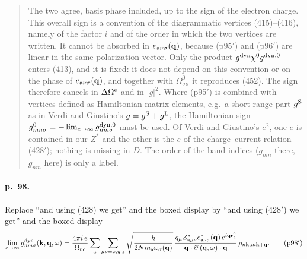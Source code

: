 \documentclass[11pt]{article}
\begin{document}
\begin{quote}
The two agree, basis phase included, up to the sign of the electron charge. This overall sign is a
convention of the diagrammatic vertices (415)--(416), namely of the factor $i$ and of the order in which
the two vertices are written. It cannot be absorbed in $e_{{\rm a}\nu\sigma}(\mathbf q)$, because (p95$'$)
and (p96$'$) are linear in the same polarization vector. Only the product $g^{\rm dyn}\chi^0g^{\rm dyn,0}$
enters (413), and it is fixed: it does not depend on this convention or on the phase of
$e_{{\rm a}\nu\sigma}(\mathbf q)$, and together with $\Omega^0_{\sigma\sigma}$ it reproduces (452). The sign
therefore cancels in $\Delta\Omega^{\rm e}$ and in $|g|^2$. Where (p95$'$) is combined with vertices defined
as Hamiltonian matrix elements, e.g.\ a short-range part $g^{\rm S}$ as in Verdi and Giustino's
$g=g^{\rm S}+g^{\rm L}$, the Hamiltonian sign $g^0_{mn\sigma}=-\lim_{c\to\infty}g^{\rm dyn,0}_{nm\sigma}$ must
be used. Of Verdi and Giustino's $e^2$, one $e$ is contained in our $Z^*$ and the other is the $e$ of the
charge--current relation (428$'$); nothing is missing in $D$. The order of the band indices ($g_{mn}$
there, $g_{nm}$ here) is only a label.
\end{quote}

\paragraph{p.~98.} Replace ``and using (428) we get'' and the boxed display by ``and using (428$'$) we
get'' and the boxed display
\begin{equation*}
\lim_{c\to\infty}g^{\rm dyn}_{nm\sigma}(\mathbf k,\mathbf q,\omega)=
\frac{4\pi i\,e}{\Omega_{\rm uc}}\sum_{\rm a}\sum_{\mu\nu=x,y,z}
\sqrt{\frac{\hbar}{2Nm_{\rm a}\omega_\sigma(\mathbf q)}}\,
\frac{q_\mu Z^*_{{\rm a}\mu\nu}e^*_{{\rm a}\nu\sigma}(\mathbf q)\,e^{i\mathbf q\mathbf r^0_{\rm a}}}
{\mathbf q\cdot\hat\epsilon^{\rm e}(\mathbf q,\omega)\cdot\mathbf q}\,
\rho_{n\mathbf k,m\mathbf k+\mathbf q} .
\tag{p98$'$}
\end{equation*}
\end{document}
